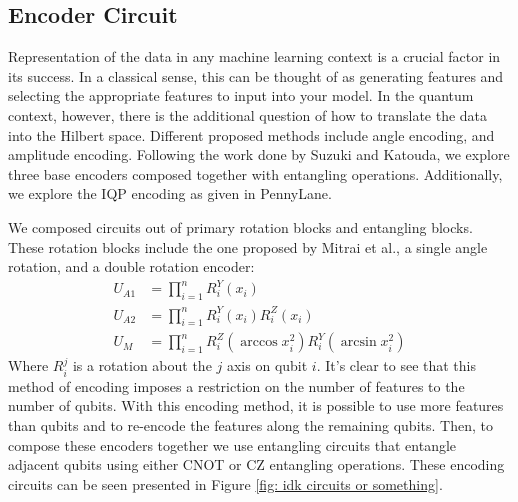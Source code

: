 \documentclass[journal=jacsat,manuscript=article]{achemso}
\begin{document}
\subsection{Encoder Circuit}
Representation of the data in any machine learning context is a crucial factor in its success. In a classical sense, this can be thought of as generating features and selecting the appropriate features to input into your model. In the quantum context, however, there is the additional question of how to translate the data into the Hilbert space. Different proposed  methods include angle encoding, and amplitude encoding. Following the work done by Suzuki and Katouda, we explore three base encoders composed together with entangling operations. Additionally, we explore the  IQP encoding as given in PennyLane. \par

We composed circuits out of primary rotation blocks and entangling blocks. These rotation blocks include the one proposed by Mitrai et al.\cite{mitarai_quantum_2018}, a single angle rotation, and a double rotation encoder:
\begin{align}
    U_{A1} &= \prod_{i=1}^n R^Y_i(x_i) \\
    U_{A2} &= \prod_{i=1}^n R^Y_i(x_i) R^Z_i(x_i) \\
    U_{M}  &= \prod_{i=1}^n R^Z_i(\arccos x_i^2) R^Y_i(\arcsin x_i^2)
\end{align}
Where $R^j_i$ is a rotation about the $j$ axis on qubit $i$. It's clear to see that this method of encoding imposes a restriction on the number of features to the number of qubits. With this encoding method, it is possible to use more features than qubits and to re-encode the features along the remaining qubits. Then, to compose these encoders together we use entangling circuits that entangle adjacent qubits using either CNOT or CZ entangling operations. These encoding circuits can be seen presented in Figure \ref{fig: idk circuits or something}. 
\end{document}
